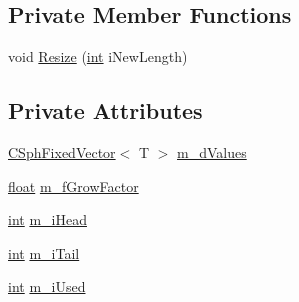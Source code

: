 \subsection*{Private Member Functions}
\begin{DoxyCompactItemize}
\item 
void \hyperlink{classCircularBuffer__T_a71c2726ac0164d9e99828e40bcf4cb34}{Resize} (\hyperlink{sphinxexpr_8cpp_a4a26e8f9cb8b736e0c4cbf4d16de985e}{int} i\-New\-Length)
\end{DoxyCompactItemize}
\subsection*{Private Attributes}
\begin{DoxyCompactItemize}
\item 
\hyperlink{classCSphFixedVector}{C\-Sph\-Fixed\-Vector}$<$ T $>$ \hyperlink{classCircularBuffer__T_aba31032d942b7729b5858059ec1944f9}{m\-\_\-d\-Values}
\item 
\hyperlink{sphinxexpr_8cpp_a0e0d0739f7035f18f949c2db2c6759ec}{float} \hyperlink{classCircularBuffer__T_a776a128440e5794ef368e6ad89dd2473}{m\-\_\-f\-Grow\-Factor}
\item 
\hyperlink{sphinxexpr_8cpp_a4a26e8f9cb8b736e0c4cbf4d16de985e}{int} \hyperlink{classCircularBuffer__T_a65e4e634ec7e8a6cbfb02d7b1bee077b}{m\-\_\-i\-Head}
\item 
\hyperlink{sphinxexpr_8cpp_a4a26e8f9cb8b736e0c4cbf4d16de985e}{int} \hyperlink{classCircularBuffer__T_a01b0f2612f9439feb11eac53b5089a03}{m\-\_\-i\-Tail}
\item 
\hyperlink{sphinxexpr_8cpp_a4a26e8f9cb8b736e0c4cbf4d16de985e}{int} \hyperlink{classCircularBuffer__T_a23ff90b0382161cdd8e9e9e530a38e1b}{m\-\_\-i\-Used}
\end{DoxyCompactItemize}


